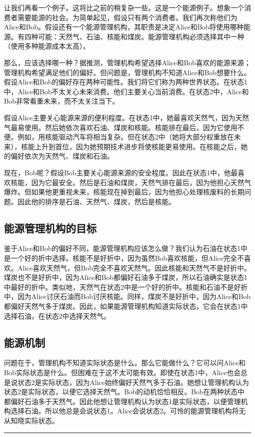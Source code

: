 \documentclass[12pt,a4paper]{article}
\newenvironment{translation}{%
  \par\vspace{2pt}\noindent%
  \color{transblue}%
  \ignorespaces
}{%
  \par\vspace{4pt}\hrule\vspace{6pt}%
}
\begin{document}
\begin{translation}
让我们再看一个例子。这将比之前的稍复杂一些。这是一个能源例子。想象一个消费者需要能源的社会。为简单起见，假设只有两个消费者。我们再次称他们为Alice和Bob。假设还有一个能源管理机构，其职责是决定Alice和Bob将使用哪种能源。有四种可能：天然气、石油、核能和煤炭。能源管理机构必须选择其中一种（使用多种能源成本太高）。

那么，应该选择哪一种？据推测，管理机构希望选择Alice和Bob喜欢的能源来源；管理机构希望满足他们的偏好。但问题是，管理机构不知道Alice和Bob想要什么。假设Alice和Bob的偏好存在两种可能性。我们将它们称为两种世界状态。在状态1中，Alice和Bob不太关心未来消费。他们主要关心当前消费。在状态2中，Alice和Bob非常看重未来，而不太关注当下。

假设Alice主要关心能源来源的便利程度。在状态1中，她最喜欢天然气，因为天然气最易使用。然后她依次喜欢石油、煤炭和核能。核能排在最后，因为它使用不便。例如，用核能驱动汽车将相当复杂。但在状态2中（她将大部分权重放在未来），核能上升到首位，因为她预期技术进步将使核能更易使用。在核能之后，她的偏好依次为天然气、煤炭和石油。

现在，Bob呢？假设Bob主要关心能源来源的安全程度。因此在状态1中，他最喜欢核能，因为它最安全。然后是石油和煤炭，天然气排在最后，因为他担心天然气爆炸。但如果他更重视未来，核能现在掉到最后，因为他担心处理核废料的长期问题。因此他的排序是石油、天然气、煤炭，然后是核能。

\subsection*{能源管理机构的目标}
鉴于Alice和Bob的偏好不同，能源管理机构应该怎么做？我们认为石油在状态1中是一个好的折中选择。核能不是好折中，因为虽然Bob喜欢核能，但Alice完全不喜欢。Alice喜欢天然气，但Bob完全不喜欢天然气。因此核能和天然气不是好折中。煤炭也不是好折中，因为Alice和Bob都偏好石油多于煤炭，所以石油确实是状态1中最好的折中。类似地，天然气在状态2中是一个好的折中。核能和石油不是好折中，因为Alice讨厌石油而Bob讨厌核能。同样，煤炭不是好折中，因为Alice和Bob都偏好天然气多于煤炭。因此，如果能源管理机构知道实际状态，它会在状态1中选择石油，在状态2中选择天然气。

\subsection*{能源机制}
问题在于，管理机构不知道实际状态是什么。那么它能做什么？它可以问Alice和Bob实际状态是什么。但困难在于这不太可能有效。即使在状态1中，Alice也会总是说状态2是实际状态，因为Alice始终偏好天然气多于石油。她想让管理机构认为状态2是实际状态，以便它选择天然气。Bob的动机恰恰相反。Bob在两种状态中都偏好石油多于天然气。因此他想让管理机构认为状态1是实际状态，以便管理机构选择石油。所以他总是会说状态1。Alice会说状态2。可怜的能源管理机构将无从知晓实际状态。


\end{translation}
\end{document}
